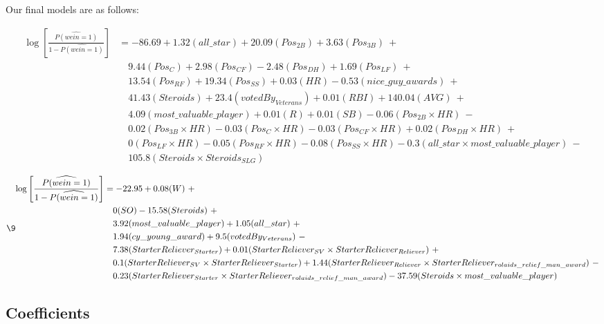 \documentclass[
]{article}
\begin{document}
Our final models are as follows:

\begin{equation}
\begin{aligned}
\log\left[ \frac { \widehat{P( wein = 1 )} }{ 1 - \widehat{P( wein = 1 )} } \right] &= -86.69 + 1.32(all\_star) + 20.09(Pos_{2B}) + 3.63(Pos_{3B})\ + \\
&\quad 9.44(Pos_{C}) + 2.98(Pos_{CF}) - 2.48(Pos_{DH}) + 1.69(Pos_{LF})\ + \\
&\quad 13.54(Pos_{RF}) + 19.34(Pos_{SS}) + 0.03(HR) - 0.53(nice\_guy\_awards)\ + \\
&\quad 41.43(Steroids) + 23.4(votedBy_{Veterans}) + 0.01(RBI) + 140.04(AVG)\ + \\
&\quad 4.09(most\_valuable\_player) + 0.01(R) + 0.01(SB) - 0.06(Pos_{2B} \times HR)\ - \\
&\quad 0.02(Pos_{3B} \times HR) - 0.03(Pos_{C} \times HR) - 0.03(Pos_{CF} \times HR) + 0.02(Pos_{DH} \times HR)\ + \\
&\quad 0(Pos_{LF} \times HR) - 0.05(Pos_{RF} \times HR) - 0.08(Pos_{SS} \times HR) - 0.3(all\_star \times most\_valuable\_player)\ - \\
&\quad 105.8(Steroids \times Steroids_{SLG})
\end{aligned}
\end{equation}

\begin{equation}
\9
\begin{aligned}
\log\left[ \frac { \widehat{P( wein = 1 )} }{ 1 - \widehat{P( wein = 1 )} } \right] &= -22.95 + 0.08(W)\ + \\
&\quad 0(SO) - 15.58(Steroids)\ + \\
&\quad 3.92(most\_valuable\_player) + 1.05(all\_star)\ + \\
&\quad 1.94(cy\_young\_award) + 9.5(votedBy_{Veterans})\ - \\
&\quad 7.38(StarterReliever_{Starter}) + 0.01(StarterReliever_{SV} \times StarterReliever_{Reliever})\ + \\
&\quad 0.1(StarterReliever_{SV} \times StarterReliever_{Starter}) + 1.44(StarterReliever_{Reliever} \times StarterReliever_{rolaids\_relief\_man\_award})\ - \\
&\quad 0.23(StarterReliever_{Starter} \times StarterReliever_{rolaids\_relief\_man\_award}) - 37.59(Steroids \times most\_valuable\_player)
\end{aligned}
\end{equation}

\hypertarget{coefficients}{%
\subsection{Coefficients}\label{coefficients}}
\end{document}
